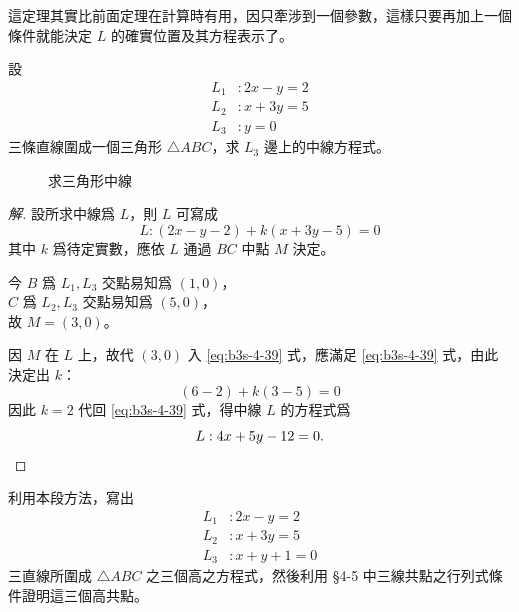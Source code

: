 這定理其實比前面定理在計算時有用，因只牽涉到一個參數，這樣只要再加上一個條件就能決定 $L$ 的確實位置及其方程表示了。

\begin{example}
設
\begin{align*}
L_1 &: 2x - y = 2 \\
L_2 &: x + 3y = 5 \\
L_3 &: y = 0
\end{align*}
三條直線圍成一個三角形 $\triangle ABC$，求 $L_3$ 邊上的中線方程式。
\end{example}

\begin{figure}[H]
\centering
{}
\caption{求三角形中線}
\label{fig:4-45}
\end{figure}

\begin{proof}[解]
設所求中線爲 $L$，則 $L$ 可寫成
\begin{equation}
L : (2x - y - 2) + k(x + 3y - 5) = 0
\label{eq:b3s-4-39}
\end{equation}
其中 $k$ 爲待定實數，應依 $L$ 通過 $BC$ 中點 $M$ 決定。

今 $B$ 爲 $L_1, L_3$ 交點易知爲 $(1, 0)$，\\
$C$ 爲 $L_2, L_3$ 交點易知爲 $(5, 0)$，\\
故 $M = (3, 0)$。

因 $M$ 在 $L$ 上，故代 $(3, 0)$ 入 \eqref{eq:b3s-4-39} 式，應滿足 \eqref{eq:b3s-4-39} 式，由此決定出 $k$：
\[
(6 - 2) + k(3 - 5) = 0
\]
因此 $k = 2$ 代回 \eqref{eq:b3s-4-39} 式，得中線 $L$ 的方程式爲
\[
L : 4x + 5y - 12 = 0. \qedhere
\]
\end{proof}

\begin{exercise}[作業 23]
利用本段方法，寫出
\begin{align*}
L_1 &: 2x - y = 2 \\
L_2 &: x + 3y = 5 \\
L_3 &: x + y + 1 = 0
\end{align*}
三直線所圍成 $\triangle ABC$ 之三個高之方程式，然後利用 \S 4-5 中三線共點之行列式條件證明這三個高共點。
\end{exercise}

